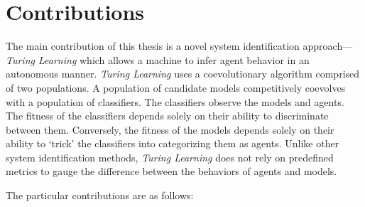
\section{Contributions}

The main contribution of this thesis is a novel system identification approach---\textit{Turing Learning} which allows a machine to infer agent behavior in an autonomous manner. \textit{Turing Learning} uses a coevolutionary algorithm comprised of two populations. A population of candidate models competitively coevolves with a population of classifiers. The classifiers observe the models and agents. The fitness of the classifiers depends solely on their ability to discriminate between them. Conversely, the fitness of the models depends solely on their ability to `trick' the classifiers into categorizing them as agents. Unlike other system identification methods, \textit{Turing Learning} does not rely on predefined metrics to gauge the difference between the behaviors of agents and models. 

The particular contributions are as follows:

